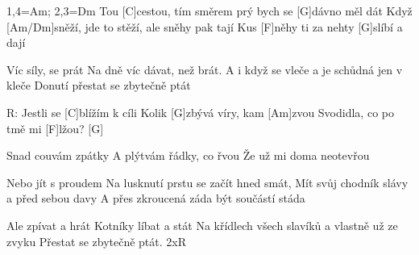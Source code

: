 
1,4=Am; 2,3=Dm
Tou [C]cestou,
tím směrem prý bych se [G]dávno měl dát 
Když [Am/Dm]sněží, jde to stěží, ale sněhy pak tají 
Kus [F]něhy ti za nehty [G]slíbí a dají

Víc síly, se prát
Na dně víc dávat, než brát.
A i když se vleče a je schůdná jen v kleče
Donutí přestat se zbytečně ptát

R: Jestli se [C]blížím k cíli
Kolik [G]zbývá víry, kam [Am]zvou
Svodidla, co po tmě mi [F]lžou? [G]

Snad couvám zpátky
A plýtvám řádky, co řvou
Že už mi doma neotevřou

Nebo jít s proudem
Na lusknutí prstu se začít hned smát, 
Mít svůj chodník slávy a před sebou davy 
A přes zkroucená záda být součástí stáda

Ale zpívat a hrát
Kotníky líbat a stát
Na křídlech všech slavíků a vlastně už ze zvyku
Přestat se zbytečně ptát. 2xR


